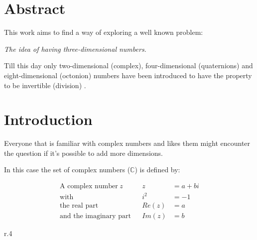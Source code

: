 \documentclass[a4paper,english,parskip]{scrartcl}
\begin{document}
	\onehalfspacing
	
	
	
	\tableofcontents
	
	\section{Abstract}
	
	This work aims to find a way of exploring a well known problem: 
	
	\begin{center}
	\textit{The idea of having three-dimensional numbers.  }
	\end{center}
	
	Till this day only two-dimensional (complex),  four-dimensional (quaternions) and eight-dimensional
	(octonion) numbers have been introduced to have the property to be invertible (division) \cite{article:100}.
	
	\newpage
	\section{Introduction}
	
	Everyone that is familiar with complex numbers and likes them might encounter the question if it's possible 
	to add more dimensions.
	
	In this case the set of complex numbers ($\mathbb{C}$) is defined by:
	
	\begin{align*}
	\text{A complex number} \hspace{3pt} z && z &= a + bi \\
	\text{with} && i^2 &= -1 \\
	\text{the real part} && Re(z) &= a \\
	\text{and the imaginary part} && Im(z) &= b 
	\end{align*}
	
	\begin{wrapfigure}[5]{r}{.4\textwidth}
	\end{wrapfigure}
	
\end{document}
